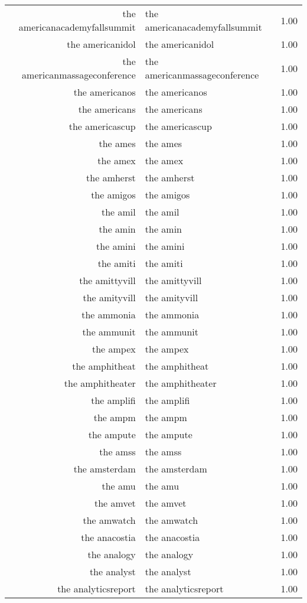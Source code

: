 \begin{table}[ht]
\begin{tabular}{rlr}
  the americanacademyfallsummit & the americanacademyfallsummit & 1.00 \\ 
  the americanidol & the americanidol & 1.00 \\ 
  the americanmassageconference & the americanmassageconference & 1.00 \\ 
  the americanos & the americanos & 1.00 \\ 
  the americans & the americans & 1.00 \\ 
  the americascup & the americascup & 1.00 \\ 
  the ames & the ames & 1.00 \\ 
  the amex & the amex & 1.00 \\ 
  the amherst & the amherst & 1.00 \\ 
  the amigos & the amigos & 1.00 \\ 
  the amil & the amil & 1.00 \\ 
  the amin & the amin & 1.00 \\ 
  the amini & the amini & 1.00 \\ 
  the amiti & the amiti & 1.00 \\ 
  the amittyvill & the amittyvill & 1.00 \\ 
  the amityvill & the amityvill & 1.00 \\ 
  the ammonia & the ammonia & 1.00 \\ 
  the ammunit & the ammunit & 1.00 \\ 
  the ampex & the ampex & 1.00 \\ 
  the amphitheat & the amphitheat & 1.00 \\ 
  the amphitheater & the amphitheater & 1.00 \\ 
  the amplifi & the amplifi & 1.00 \\ 
  the ampm & the ampm & 1.00 \\ 
  the ampute & the ampute & 1.00 \\ 
  the amss & the amss & 1.00 \\ 
  the amsterdam & the amsterdam & 1.00 \\ 
  the amu & the amu & 1.00 \\ 
  the amvet & the amvet & 1.00 \\ 
  the amwatch & the amwatch & 1.00 \\ 
  the anacostia & the anacostia & 1.00 \\ 
  the analogy & the analogy & 1.00 \\ 
  the analyst & the analyst & 1.00 \\ 
  the analyticsreport & the analyticsreport & 1.00 \\ 

\end{tabular}
\end{table}
